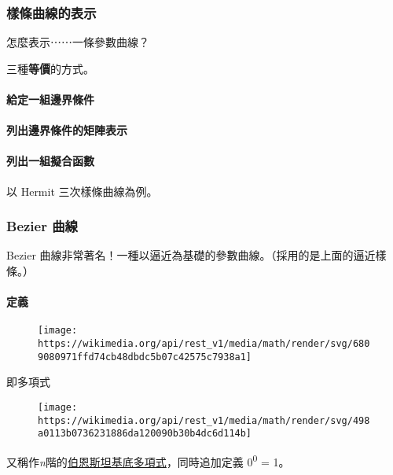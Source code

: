 \documentclass[
]{article}
\begin{document}
\hypertarget{header-n19}{%
\subsubsection{樣條曲線的表示}\label{header-n19}}

怎麼表示⋯⋯一條參數曲線？

三種\textbf{等價}的方式。

\hypertarget{header-n22}{%
\paragraph{給定一組邊界條件}\label{header-n22}}

\hypertarget{header-n23}{%
\paragraph{列出邊界條件的矩陣表示}\label{header-n23}}

\hypertarget{header-n24}{%
\paragraph{列出一組擬合函數}\label{header-n24}}

以 Hermit 三次樣條曲線為例。

\hypertarget{header-n26}{%
\subsubsection{Bezier 曲線}\label{header-n26}}

Bezier
曲線非常著名！一種以逼近為基礎的參數曲線。（採用的是上面的逼近樣條。）

\hypertarget{header-n28}{%
\paragraph{定義}\label{header-n28}}

\begin{figure}
\centering
\texttt{[image: https://wikimedia.org/api/rest\_v1/media/math/render/svg/6809080971ffd74cb48dbdc5b07c42575c7938a1]}
\caption{}
\end{figure}

即多項式

\begin{figure}
\centering
\texttt{[image: https://wikimedia.org/api/rest\_v1/media/math/render/svg/498a0113b0736231886da120090b30b4dc6d114b]}
\caption{}
\end{figure}

又稱作\emph{n}階的\href{https://zh.wikipedia.org/w/index.php?title=伯恩斯坦多項式\&action=edit\&redlink=1}{伯恩斯坦基底多項式}，同時追加定義
0\textsuperscript{0} = 1。
\end{document}
